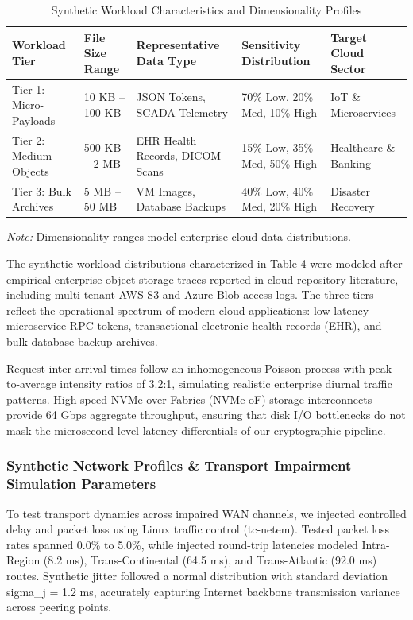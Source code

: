 \documentclass[5p,times]{elsarticle}
\begin{document}
\begin{table}[!t]
  \centering
  \footnotesize
  \caption{Synthetic Workload Characteristics and Dimensionality Profiles}
  \label{tab:4}
  \begin{tabularx}{\textwidth}{p{3.2cm}p{2.6cm}p{4.2cm}p{3.5cm}X}
    \toprule
    \textbf{Workload Tier} & \textbf{File Size Range} & \textbf{Representative Data Type} & \textbf{Sensitivity Distribution} & \textbf{Target Cloud Sector} \\
    \midrule
    Tier 1: Micro-Payloads & 10 KB -- 100 KB & JSON Tokens, SCADA Telemetry & 70\% Low, 20\% Med, 10\% High & IoT \& Microservices \\
    Tier 2: Medium Objects & 500 KB -- 2 MB & EHR Health Records, DICOM Scans & 15\% Low, 35\% Med, 50\% High & Healthcare \& Banking \\
    Tier 3: Bulk Archives & 5 MB -- 50 MB & VM Images, Database Backups & 40\% Low, 40\% Med, 20\% High & Disaster Recovery \\
    \bottomrule
  \end{tabularx}
  \vspace{2pt}
  \flushleft\scriptsize \textit{Note:} Dimensionality ranges model enterprise cloud data distributions.
\end{table}

The synthetic workload distributions characterized in Table 4 were modeled after empirical enterprise object storage traces reported in cloud repository literature, including multi-tenant AWS S3 and Azure Blob access logs. The three tiers reflect the operational spectrum of modern cloud applications: low-latency microservice RPC tokens, transactional electronic health records (EHR), and bulk database backup archives.

Request inter-arrival times follow an inhomogeneous Poisson process with peak-to-average intensity ratios of 3.2:1, simulating realistic enterprise diurnal traffic patterns. High-speed NVMe-over-Fabrics (NVMe-oF) storage interconnects provide 64 Gbps aggregate throughput, ensuring that disk I/O bottlenecks do not mask the microsecond-level latency differentials of our cryptographic pipeline.


\subsubsection{Synthetic Network Profiles \& Transport Impairment Simulation Parameters}

To test transport dynamics across impaired WAN channels, we injected controlled delay and packet loss using Linux traffic control (tc-netem). Tested packet loss rates spanned 0.0\% to 5.0\%, while injected round-trip latencies modeled Intra-Region (8.2 ms), Trans-Continental (64.5 ms), and Trans-Atlantic (92.0 ms) routes. Synthetic jitter followed a normal distribution with standard deviation sigma\_j = 1.2 ms, accurately capturing Internet backbone transmission variance across peering points.
\end{document}
